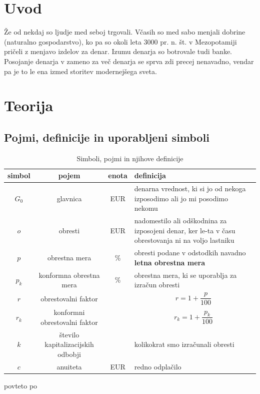 \documentclass[12pt]{article}
\begin{document}
\newpage
\section{Uvod}
Že od nekdaj so ljudje med seboj trgovali. Včasih so med sabo menjali dobrine (naturalno 
gospodarstvo), ko pa so okoli leta 3000 pr. n. št. v Mezopotamiji \cite{wiki:money} pričeli
z menjavo izdelov za denar. Izumu denarja so botrovale tudi banke. Posojanje denarja v 
zameno za več denarja se sprva zdi precej nenavadno, vendar pa je to le ena izmed storitev
modernejšega sveta. 

\section{Teorija}
    \subsection{Pojmi, definicije in uporabljeni simboli}
        \begin{table}[h!]
            \centering
            \begin{tabular}{|c|c|c|p{7cm}|}
                \hline
                \textbf{simbol} & \textbf{pojem} & \textbf{enota} & \textbf{definicija} \\ \hline
                $G_0$ & glavnica                & EUR    & denarna vrednost, ki si jo od nekoga izposodimo ali jo mi posodimo nekomu \\ \hline 
                $o$   & obresti                 & EUR    & nadomestilo ali odškodnina za izposojeni denar, ker le-ta v času obrestovanja ni na voljo lastniku \\ \hline
                $p$   & obrestna mera           & \%     & obresti podane v odstodkih navadno \textbf{letna obrestna mera} \\ \hline
                $p_k$ & konformna obrestna mera & \%     & obrestna mera, ki se uporablja za izračun obresti \\ \hline
                $r$   & obrestovalni faktor     &        & $$r = 1 + \frac{p}{100}$$ \\ \hline
                $r_k$ & konformni obrestovalni faktor &  & $$r_k = 1 + \frac{p_k}{100}$$ \\ \hline
                $k$   & število kapitalizacijskih odbobji &  & kolikokrat smo izračunali obresti \\ \hline
                $c$   & anuiteta                & EUR    & redno odplačilo \\ \hline
            \end{tabular}

            \medskip
            \centering povteto po \cite{vega4}
            \caption{Simboli, pojmi in njihove definicije}
            \label{tab:simboli}
        \end{table}
\end{document}
